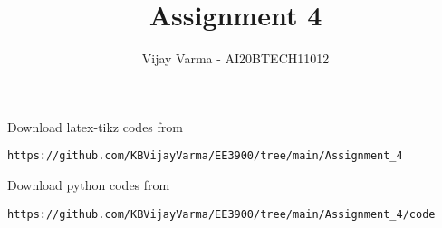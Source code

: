 \documentclass[journal,12pt,twocolumn]{IEEEtran}
\DeclareMathOperator*{\Res}{Res}
\begin{document}
\newcommand{\BEQA}{\begin{eqnarray}}
\newcommand{\EEQA}{\end{eqnarray}}
\newcommand{\define}{\stackrel{\triangle}{=}}

\raggedbottom
\setlength{\parindent}{0pt}
\providecommand{\mbf}{\mathbf}
\providecommand{\pr}[1]{\ensuremath{\Pr\left(#1\right)}}
\providecommand{\qfunc}[1]{\ensuremath{Q\left(#1\right)}}
\providecommand{\sbrak}[1]{\ensuremath{{}\left[#1\right]}}
\providecommand{\lsbrak}[1]{\ensuremath{{}\left[#1\right.}}
\providecommand{\rsbrak}[1]{\ensuremath{{}\left.#1\right]}}
\providecommand{\brak}[1]{\ensuremath{\left(#1\right)}}
\providecommand{\lbrak}[1]{\ensuremath{\left(#1\right.}}
\providecommand{\rbrak}[1]{\ensuremath{\left.#1\right)}}
\providecommand{\cbrak}[1]{\ensuremath{\left\{#1\right\}}}
\providecommand{\lcbrak}[1]{\ensuremath{\left\{#1\right.}}
\providecommand{\rcbrak}[1]{\ensuremath{\left.#1\right\}}}
\theoremstyle{remark}
\newtheorem{rem}{Remark}
\newcommand{\sgn}{\mathop{\mathrm{sgn}}}
\providecommand{\abs}[1]{\vert#1\vert}
\providecommand{\res}[1]{\Res\displaylimits_{#1}} 
\providecommand{\norm}[1]{\lVert#1\rVert}
\providecommand{\mtx}[1]{\mathbf{#1}}
\providecommand{\mean}[1]{E[ #1 ]}
\providecommand{\fourier}{\overset{\mathcal{F}}{ \rightleftharpoons}}
\providecommand{\system}{\overset{\mathcal{H}}{ \longleftrightarrow}}
\newcommand{\solution}{\noindent \textbf{Solution: }}
\newcommand{\cosec}{\,\text{cosec}\,}
\providecommand{\dec}[2]{\ensuremath{\overset{#1}{\underset{#2}{\gtrless}}}}
\newcommand{\myvec}[1]{\ensuremath{\begin{pmatrix}#1\end{pmatrix}}}
\newcommand{\mydet}[1]{\ensuremath{\begin{vmatrix}#1\end{vmatrix}}}
\makeatletter
{}
\makeatother
\let\StandardTheFigure\thefigure
\let\vec\mathbf
\renewcommand{\thefigure}{\theproblem}
\def\putbox#1#2#3{\makebox[0in][l]{\makebox[#1][l]{}\raisebox{\baselineskip}[0in][0in]{\raisebox{#2}[0in][0in]{#3}}}}
     \def\rightbox#1{\makebox[0in][r]{#1}}
     \def\centbox#1{\makebox[0in]{#1}}
     \def\topbox#1{\raisebox{-\baselineskip}[0in][0in]{#1}}
     \def\midbox#1{\raisebox{-0.5\baselineskip}[0in][0in]{#1}}
\vspace{3cm}
\title{Assignment 4}
\author{Vijay Varma - AI20BTECH11012}
\maketitle
\newpage
\bigskip
\renewcommand{\thefigure}{\theenumi}
\renewcommand{\thetable}{\theenumi}
%
Download latex-tikz codes from 
%
\begin{lstlisting}
https://github.com/KBVijayVarma/EE3900/tree/main/Assignment_4
\end{lstlisting}
%
Download python codes from 
%
\begin{lstlisting}
https://github.com/KBVijayVarma/EE3900/tree/main/Assignment_4/code
\end{lstlisting}
\end{document}
